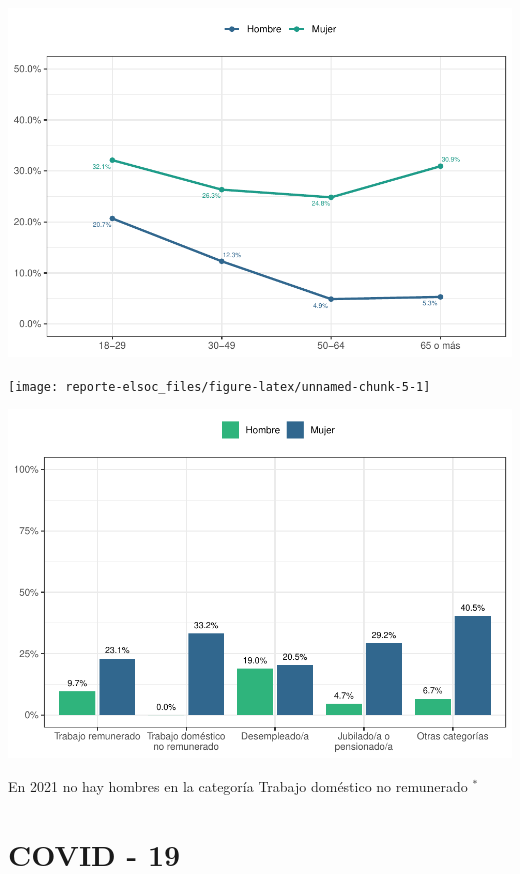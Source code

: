 \documentclass[
  12pt,
]{book}
\begin{document}
\begin{center}\includegraphics{reporte-elsoc_files/figure-latex/depre-edad-sexo-1} \end{center}

\begin{center}\texttt{[image: reporte-elsoc\_files/figure-latex/unnamed-chunk-5-1]} \end{center}

\begin{center}\includegraphics{reporte-elsoc_files/figure-latex/depre-labstat-1} \end{center}

En 2021 no hay hombres en la categoría Trabajo doméstico no remunerado \(^{*}\)

\hypertarget{covid---19}{%
\section{COVID - 19}\label{covid---19}}
\end{document}
